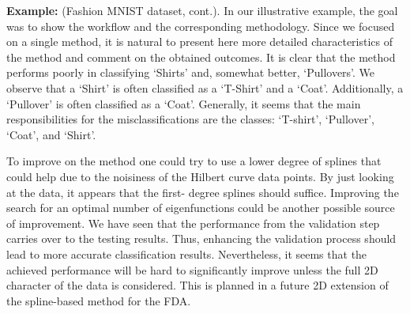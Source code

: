 \begin{enumerate}[leftmargin=0.2cm]
\noindent\textbf{Example:} (Fashion MNIST dataset, cont.).
In our illustrative example, the goal was to show the workflow and the corresponding methodology. 
Since we focused on a single method, it is natural to present here more detailed characteristics of the method and comment on the obtained outcomes.
It is clear that the method performs poorly in classifying `Shirts' and, somewhat better, `Pullovers'.  We observe that a `Shirt' is often classified as a `T-Shirt' and a `Coat'. Additionally, a `Pullover' is often classified as a `Coat'. 
Generally, it seems that the main responsibilities for the misclassifications are the classes: `T-shirt', `Pullover', `Coat', and `Shirt'. 

To improve on the method one could try to use a lower {  degree} of splines that could help due to the noisiness of the Hilbert curve data points. 
By just looking at the data, it appears that the first-{  degree} splines should suffice.
Improving the search for an optimal number of eigenfunctions could be another possible source of improvement. 
We have seen that the performance from the validation step carries over to the testing results.
Thus, enhancing the validation process should lead to more accurate classification results.
Nevertheless, it seems that the achieved performance will be hard to significantly improve unless the full 2D character of the data is considered. 
This is planned in a future 2D extension of the spline-based method for the FDA. 





\end{enumerate}
